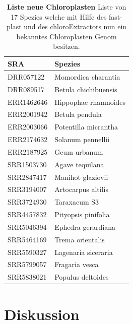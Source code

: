 \documentclass{scrartcl}
\begin{document}
\begin{table}[!h]
\caption[Liste neue Chloroplasten]{\textbf{Liste neue Chloroplasten} Liste von 17 Spezies welche mit Hilfe des fast-plast und des chloroExtractors nun ein bekanntes Chloroplasten Genom besitzen.}
\begin{center}
\begin{tabular}{ll}
SRA & Spezies\\
\hline
DRR057122 & Momordica charantia\\
DRR089517 & Betula chichibuensis\\
ERR1462646 & Hippophae rhamnoides\\
ERR2001942 & Betula pendula\\
ERR2003066 & Potentilla micrantha\\
ERR2174632 & Solanum pennellii\\
ERR2187925 & Geum urbanum\\
SRR1503730 & Agave tequilana\\
SRR2847417 & Manihot glaziovii\\
SRR3194007 & Artocarpus altilis\\
SRR3724930 & Taraxacum S3\\
SRR4457832 & Pityopsis pinifolia\\
SRR5046394 & Ephedra gerardiana\\
SRR5464169 & Trema orientalis\\
SRR5590327 & Lagenaria siceraria\\
SRR5799057 & Fragaria vesca\\
SRR5838021 & Populus deltoides\\
\end{tabular}
\end{center}
\end{table}

\section{Diskussion}
\label{sec-5}
\end{document}
